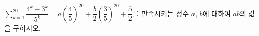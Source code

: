 $\displaystyle\sum_{k=1}^{20}\dfrac{4^k-3^k}{5^k}=a\left(\dfrac{4}{5}\right)^{20}+\dfrac{b}{2}\left(\dfrac{3}{5}\right)^{20}+\dfrac{5}{2}$를 만족시키는 정수 $a$, $b$에 대하여 $ab$의 값을 구하시오.
